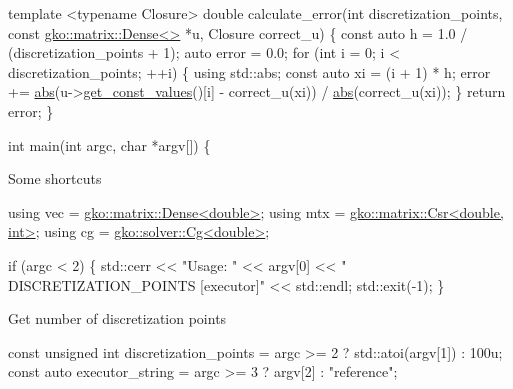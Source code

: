 \begin{DoxyCode}
\textcolor{keyword}{template} <\textcolor{keyword}{typename} Closure>
\textcolor{keywordtype}{double} calculate\_error(\textcolor{keywordtype}{int} discretization\_points, \textcolor{keyword}{const} \hyperlink{classgko_1_1matrix_1_1Dense}{gko::matrix::Dense<>} *u,
                       Closure correct\_u)
\{
    \textcolor{keyword}{const} \textcolor{keyword}{auto} h = 1.0 / (discretization\_points + 1);
    \textcolor{keyword}{auto} error = 0.0;
    \textcolor{keywordflow}{for} (\textcolor{keywordtype}{int} i = 0; i < discretization\_points; ++i) \{
        \textcolor{keyword}{using} std::abs;
        \textcolor{keyword}{const} \textcolor{keyword}{auto} xi = (i + 1) * h;
        error +=
            \hyperlink{namespacegko_a57797fc0a00fd4b7ff34ca4bfc84bc51}{abs}(u->\hyperlink{classgko_1_1matrix_1_1Dense_ab83c739c1b11abaecc3bfd89506f6c9c}{get\_const\_values}()[i] - correct\_u(xi)) / 
      \hyperlink{namespacegko_a57797fc0a00fd4b7ff34ca4bfc84bc51}{abs}(correct\_u(xi));
    \}
    \textcolor{keywordflow}{return} error;
\}


\textcolor{keywordtype}{int} main(\textcolor{keywordtype}{int} argc, \textcolor{keywordtype}{char} *argv[])
\{
\end{DoxyCode}


Some shortcuts


\begin{DoxyCode}
\textcolor{keyword}{using} vec = \hyperlink{classgko_1_1matrix_1_1Dense}{gko::matrix::Dense<double>};
\textcolor{keyword}{using} mtx = \hyperlink{classgko_1_1matrix_1_1Csr}{gko::matrix::Csr<double, int>};
\textcolor{keyword}{using} cg = \hyperlink{classgko_1_1solver_1_1Cg}{gko::solver::Cg<double>};

\textcolor{keywordflow}{if} (argc < 2) \{
    std::cerr << \textcolor{stringliteral}{"Usage: "} << argv[0] << \textcolor{stringliteral}{" DISCRETIZATION\_POINTS [executor]"}
              << std::endl;
    std::exit(-1);
\}
\end{DoxyCode}


Get number of discretization points


\begin{DoxyCode}
\textcolor{keyword}{const} \textcolor{keywordtype}{unsigned} \textcolor{keywordtype}{int} discretization\_points =
    argc >= 2 ? std::atoi(argv[1]) : 100u;
\textcolor{keyword}{const} \textcolor{keyword}{auto} executor\_string = argc >= 3 ? argv[2] : \textcolor{stringliteral}{"reference"};
\end{DoxyCode}


